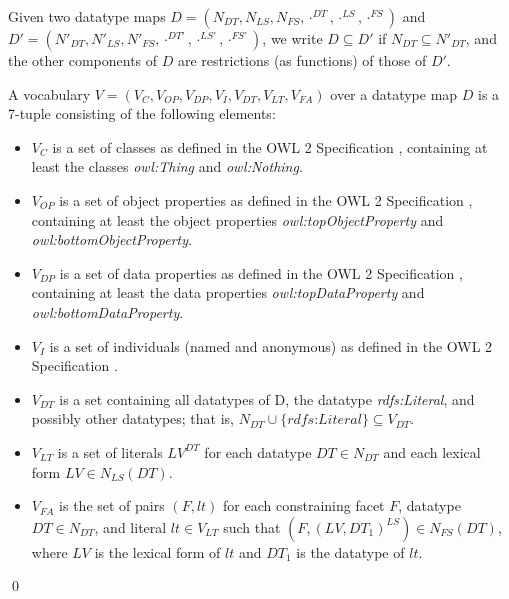 \documentclass[10pt,fleqn,final]{scrreprt}
\newenvironment{definitions}[0]{\medskip }{}
\begin{document}
\begin{definitions}
Given two datatype maps $D = ( N_{DT} , N_{LS} , N_{FS} , \cdot^{DT} , \cdot^{LS} , \cdot^{FS} )$ and $D' = ( N'_{DT} , N'_{LS} , N'_{FS} , \cdot^{DT'} , \cdot^{LS'} , \cdot^{FS'} )$, we write $D\subseteq D'$ if $N_{DT}\subseteq N'_{DT}$, and
the other components of $D$ are restrictions (as functions) of those of $D'$.

\begin{definition}
A vocabulary $V = ( V_{C} , V_{OP} , V_{DP} , V_{I} , V_{DT} , V_{LT} , V_{FA} )$ over a datatype map $D$ is a 7-tuple consisting of the following elements:
\begin{itemize}
\item
    $V_{C}$ is a set of classes as defined in the OWL 2 Specification \cite{w3c:owl2-spec}, containing at least the classes \textit{owl:Thing} and \textit{owl:Nothing}.
\item
    $V_{OP}$ is a set of object properties as defined in the OWL 2 Specification \cite{w3c:owl2-spec}, containing at least the object properties \textit{owl:topObjectProperty} and \textit{owl:bottomObjectProperty}.
\item
    $V_{DP}$ is a set of data properties as defined in the OWL 2 Specification \cite{w3c:owl2-spec}, containing at least the data properties \textit{owl:topDataProperty} and \textit{owl:bottomDataProperty}.
\item
    $V_{I}$ is a set of individuals (named and anonymous) as defined in the OWL 2 Specification \cite{w3c:owl2-spec}.
\item
    $V_{DT}$ is a set containing all datatypes of D, the datatype \textit{rdfs:Literal}, and possibly other datatypes; that is, $N_{DT} \cup \{ \textit{rdfs:Literal} \} \subseteq V_{DT}$.
\item
    $V_{LT}$ is a set of literals $LV^{DT}$ for each datatype $DT \in N_{DT}$ and each lexical form $LV \in N_{LS}(DT)$.
\item
    $V_{FA}$ is the set of pairs $( F , lt )$ for each constraining facet $F$, datatype $DT \in N_{DT}$, and literal $lt \in V_{LT}$ such that $( F , ( LV , DT_1 )^{LS} ) \in N_{FS}(DT)$, where $LV$ is the lexical form of $lt$ and $DT_1$ is the datatype of $lt$. 
\end{itemize}
\qed\end{definition}



\end{definitions}
\end{document}
